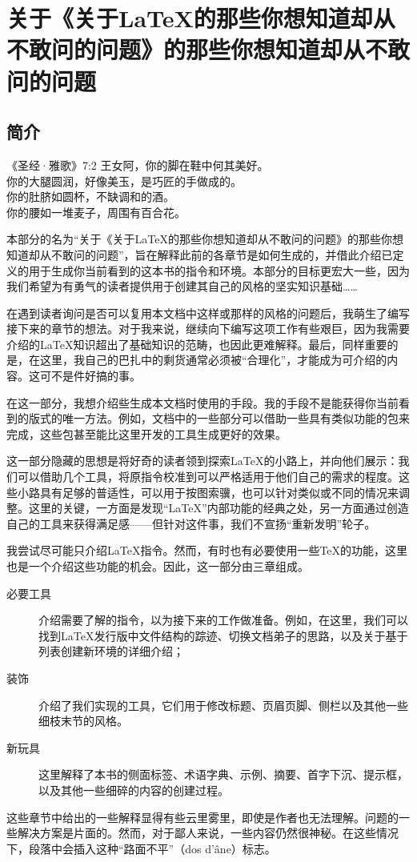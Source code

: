 \part{关于《关于\LaTeX 的那些你想知道却从不敢问的问题》的那些你想知道却从不敢问的问题}

\chapter*{简介}

\begin{epigraphe}{《圣经·雅歌》7:2}
    王女阿，你的脚在鞋中何其美好。\\你的大腿圆润，好像美玉，是巧匠的手做成的。\\你的肚脐如圆杯，不缺调和的酒。\\你的腰如一堆麦子，周围有百合花。
\end{epigraphe}

本部分的名为“关于《关于\LaTeX 的那些你想知道却从不敢问的问题》的那些你想知道却从不敢问的问题”，旨在解释此前的各章节是如何生成的，并借此介绍已定义的用于生成你当前看到的这本书的指令和环境。本部分的目标更宏大一些，因为我们希望为有勇气的读者提供用于创建其自己的风格的坚实知识基础……

在遇到读者询问是否可以复用本文档中这样或那样的风格的问题后，我萌生了编写接下来的章节的想法。对于我来说，继续向下编写这项工作有些艰巨，因为我需要介绍的\LaTeX 知识超出了基础知识的范畴，也因此更难解释。最后，同样重要的是，在这里，我自己的巴扎中的剩货通常必须被“合理化”，才能成为可介绍的内容。这可不是件好搞的事。

在这一部分，我想介绍些生成本文档时使用的手段。我的手段不是能获得你当前看到的版式的唯一方法。例如，文档中的一些部分可以借助一些具有类似功能的包来完成，这些包甚至能比这里开发的工具生成更好的效果。

这一部分隐藏的思想是将好奇的读者领到探索\LaTeX 的小路上，并向他们展示：我们可以借助几个工具，将原指令校准到可以严格适用于他们自己的需求的程度。这些小路具有足够的普适性，可以用于按图索骥，也可以针对类似或不同的情况来调整。这里的关键，一方面是发现“\LaTeX ”内部功能的经典之处，另一方面通过创造自己的工具来获得满足感——但针对这件事，我们不宣扬“重新发明”轮子。

我尝试尽可能只介绍\LaTeX 指令。然而，有时也有必要使用一些\TeX 的功能，这里也是一个介绍这些功能的机会。因此，这一部分由三章组成。

\begin{description}
    \item[必要工具] 介绍需要了解的指令，以为接下来的工作做准备。例如，在这里，我们可以找到\LaTeX 发行版中文件结构的踪迹、切换文档弟子的思路，以及关于基于列表创建新环境的详细介绍；
    \item[装饰] 介绍了我们实现的工具，它们用于修改标题、页眉页脚、侧栏以及其他一些细枝末节的风格。
    \item[新玩具] 这里解释了本书的侧面标签、术语字典、示例、摘要、首字下沉、提示框，以及其他一些细碎的内容的创建过程。
\end{description}

\begin{qquestion}
这些章节中给出的一些解释显得有些云里雾里，即使是作者也无法理解。问题的一些解决方案是片面的。然而，对于鄙人来说，一些内容仍然很神秘。在这些情况下，段落中会插入这种“路面不平”（dos d'âne）标志。
\end{qquestion}